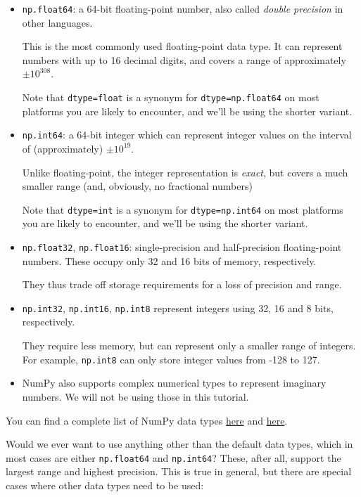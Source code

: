 \documentclass{scrartcl}
\begin{document}
\begin{itemize}
\item
  \texttt{np.float64}: a 64-bit floating-point number, also called
  \emph{double precision} in other languages.

  This is the most commonly used floating-point data type. It can
  represent numbers with up to 16 decimal digits, and covers a range of
  approximately \(\pm 10^{308}\).

  Note that \texttt{dtype=float} is a synonym for
  \texttt{dtype=np.float64} on most platforms you are likely to
  encounter, and we'll be using the shorter variant.
\item
  \texttt{np.int64}: a 64-bit integer which can represent integer values
  on the interval of (approximately) \(\pm10^{19}\).

  Unlike floating-point, the integer representation is \emph{exact}, but
  covers a much smaller range (and, obviously, no fractional numbers)

  Note that \texttt{dtype=int} is a synonym for \texttt{dtype=np.int64}
  on most platforms you are likely to encounter, and we'll be using the
  shorter variant.
\item
  \texttt{np.float32}, \texttt{np.float16}: single-precision and
  half-precision floating-point numbers. These occupy only 32 and 16
  bits of memory, respectively.

  They thus trade off storage requirements for a loss of precision and
  range.
\item
  \texttt{np.int32}, \texttt{np.int16}, \texttt{np.int8} represent
  integers using 32, 16 and 8 bits, respectively.

  They require less memory, but can represent only a smaller range of
  integers. For example, \texttt{np.int8} can only store integer values
  from -128 to 127.
\item
  NumPy also supports complex numerical types to represent imaginary
  numbers. We will not be using those in this tutorial.
\end{itemize}

You can find a complete list of NumPy data types
\href{https://numpy.org/doc/stable/user/basics.types.html}{here} and
\href{https://numpy.org/doc/stable/reference/arrays.scalars.html\#sized-aliases}{here}.

    Would we ever want to use anything other than the default data types,
which in most cases are either \texttt{np.float64} and
\texttt{np.int64}? These, after all, support the largest range and
highest precision. This is true in general, but there are special cases
where other data types need to be used:
\end{document}
